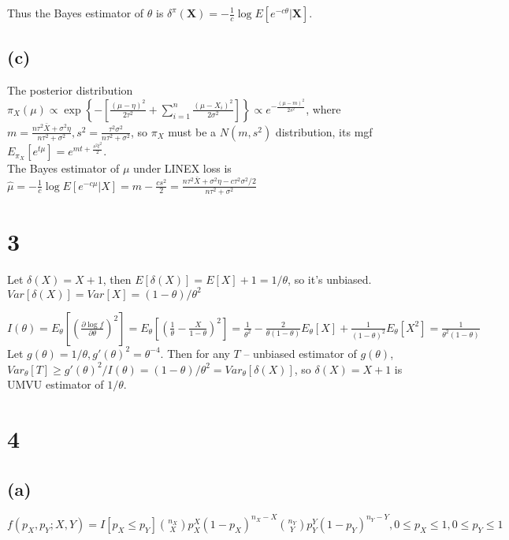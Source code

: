 Thus the Bayes estimator of $\theta$ is
$
\delta^{\pi}(\mathbf{X}) =
-\frac{1}{c}\log E[e^{-c\theta} | \mathbf{X}]
$.

\subsection*{(c)}
The posterior distribution
$
\pi_X(\mu) \propto
\exp \left\{-\left[
\frac{(\mu-\eta)^2}{2\tau^2} +
\sum_{i=1}^{n} \frac{(\mu-X_i)^2}{2\sigma^2}
\right]\right\}
\propto
e^{-\frac{(\mu-m)^2}{2s^2}}
$, where \\
$
m= \frac{n\tau^2\bar{X} + \sigma^2 \eta}{n\tau^2 + \sigma^2}
,
s^2=\frac{\tau^2\sigma^2}{n\tau^2+\sigma^2}
$,
so $\pi_X$ must be a $N(m, s^2)$ distribution, its mgf
$
E_{\pi_X}[e^{t\mu}]= e^{mt+\frac{s^2t^2}{2}}
$.
\\
The Bayes estimator of $\mu$ under LINEX loss is
$
\hat{\mu} =
-\frac{1}{c} \log E[e^{-c\mu} | X] =
m-\frac{cs^2}{2} =
\frac{n\tau^2\bar{X} + \sigma^2 \eta - c\tau^2\sigma^2/2}{n\tau^2 + \sigma^2}
$

\section*{3}
Let
$
\delta(X) = X+1
$, then
$
E[\delta(X)] = E[X]+1 = 1/\theta
$, so it's unbiased.
$
Var[\delta(X)] = Var[X] = (1-\theta)/\theta^2
$

$
I(\theta) =
E_{\theta}\left[\left(\frac{\partial \log f}{\partial \theta}\right)^2\right] = 
E_{\theta}\left[\left(\frac{1}{\theta} - \frac{X}{1-\theta}\right)^2\right] =
\frac{1}{\theta^2} - \frac{2}{\theta(1-\theta)}E_{\theta}[X] +
\frac{1}{(1-\theta)^2}E_{\theta}[X^2] =
\frac{1}{\theta^2(1-\theta)}
$
\\
Let $g(\theta) = 1/\theta, g'(\theta)^2 = \theta^{-4}$.
Then for any $T$ -- unbiased estimator of $g(\theta)$,\\
$
Var_{\theta}[T] \geq g'(\theta)^2/I(\theta) = (1-\theta)/\theta^2 =
Var_{\theta}[\delta(X)]
$,
so $\delta(X)=X+1$ is UMVU estimator of $1/\theta$.

\section*{4}
\subsection*{(a)}
$
f(p_X, p_Y; X, Y) =
I[p_X \leq p_Y]
{n_X \choose X} p_X^{X} (1-p_X)^{n_X - X}
{n_Y \choose Y} p_Y^{Y} (1-p_Y)^{n_Y - Y},
0 \leq p_X \leq 1, 0 \leq p_Y \leq 1
$

